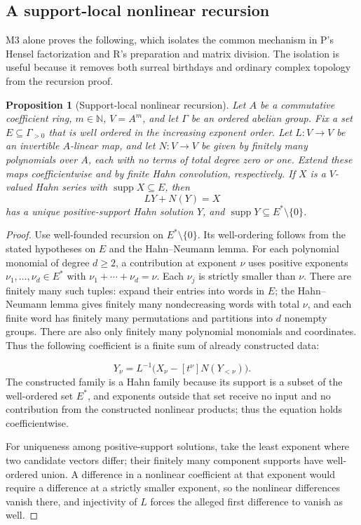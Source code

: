 \documentclass[11pt,letterpaper]{article}
\numberwithin{equation}{section}
\newtheorem{proposition}[theorem]{Proposition}
\theoremstyle{definition}
\theoremstyle{remark}
\newcommand{\N}{\mathbb N}
\newcommand{\supp}{\operatorname{supp}}
\begin{document}
\subsection{A support-local nonlinear recursion}
\label{found:sub:nonlinear}
M3 alone proves the following, which isolates the common mechanism in P's Hensel
factorization and R's preparation and matrix division. The isolation is useful
because it removes both surreal birthdays and ordinary complex topology from the
recursion proof.

\begin{proposition}[Support-local nonlinear recursion]\label{found:prop:positive}
Let $A$ be a commutative coefficient ring, $m\in\N$, $V=A^m$, and let
$\Gamma$ be an ordered abelian group. Fix a \emph{set} $E\subseteq\Gamma_{>0}$
that is well ordered in the increasing exponent order. Let $L:V\to V$ be an
invertible $A$-linear map, and let $N:V\to V$ be given by finitely many
polynomials over $A$, each with no terms of total degree zero or one. Extend
these maps coefficientwise and by finite Hahn convolution, respectively. If
$X$ is a $V$-valued Hahn series with $\supp X\subseteq E$, then
\[
 LY+N(Y)=X
\]
has a unique positive-support Hahn solution $Y$, and $\supp Y\subseteq
E^*\setminus\{0\}$.
\end{proposition}
\begin{proof}
Use well-founded recursion on $E^*\setminus\{0\}$. Its well-ordering follows
from the stated hypotheses on $E$ and the Hahn--Neumann lemma. For each
polynomial monomial of degree $d\ge2$, a contribution at exponent $\nu$ uses
positive exponents $\nu_1,\ldots,\nu_d\in E^*$ with
$\nu_1+\cdots+\nu_d=\nu$. Each $\nu_j$ is strictly smaller than $\nu$.
There are finitely many such tuples: expand their entries into words in $E$;
the Hahn--Neumann lemma gives finitely many nondecreasing words with total
$\nu$, and each finite word has finitely many permutations and partitions
into $d$ nonempty groups. There are also only finitely many polynomial
monomials and coordinates. Thus the following coefficient is a finite sum of
already constructed data:

\[
 Y_\nu=L^{-1}\bigl(X_\nu-[t^\nu]N(Y_{<\nu})\bigr).
\]
The constructed family is a Hahn family because its support is a subset of the
well-ordered set $E^*$, and exponents outside that set receive no input and no
contribution from the constructed nonlinear products; thus the equation holds
coefficientwise.

For uniqueness among positive-support solutions, take the least exponent where
two candidate vectors differ; their finitely many component supports have
well-ordered union. A difference in a nonlinear coefficient at that exponent
would require a difference at a strictly smaller exponent, so the nonlinear
differences vanish there, and injectivity of $L$ forces the alleged first
difference to vanish as well.
\end{proof}
\end{document}

